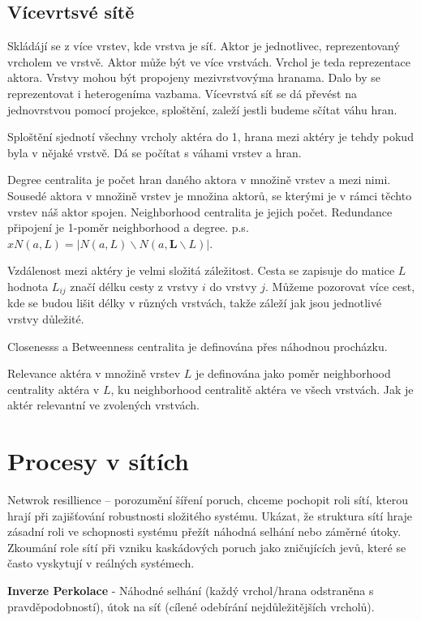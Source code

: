 \documentclass[a4paper,12pt]{article}
\begin{document}
\subsection{Vícevrtsvé sítě}
Skládájí se z více vrstev, kde vrstva je síť. Aktor je jednotlivec, reprezentovaný vrcholem ve vrstvě. Aktor může být ve více vrstvách. Vrchol je teda
reprezentace aktora. Vrstvy mohou být propojeny mezivrstvovýma hranama. Dalo by se reprezentovat i heterogeníma vazbama.
Vícevrstvá síť se dá převést na jednovrstvou pomocí projekce, sploštění, zaleží jestli budeme sčítat váhu hran.

Sploštění sjednotí všechny vrcholy aktéra do 1, hrana mezi aktéry je tehdy pokud byla v nějaké vrstvě. Dá se počítat s váhami vrstev a hran.

Degree centralita je počet hran daného aktora v množině vrstev a mezi nimi. Sousedé aktora v množině vrstev je množina aktorů, se kterými je v rámci těchto vrstev 
náš aktor spojen. Neighborhood centralita je jejich počet. Redundance připojení je 1-poměr neighborhood a degree. p.s.$xN(a,L)=|N(a,L) \smallsetminus N(a,\textbf{L}\smallsetminus L)|$.

Vzdálenost mezi aktéry je velmi složitá záležitost. Cesta se zapisuje do matice $L$ hodnota $L_{ij}$ značí délku cesty z vrstvy $i$ do vrstvy $j$. Můžeme 
pozorovat více cest, kde se budou lišit délky v různých vrstvách, takže záleží jak jsou jednotlivé vrstvy důležité.

Closenesss a Betweenness centralita je definována přes náhodnou procházku.

Relevance aktéra v množině vrstev $L$ je definována jako poměr neighborhood centrality aktéra v $L$, ku neighborhood centralitě aktéra ve všech vrstvách.
Jak je aktér relevantní ve zvolených vrstvách.

\section{Procesy v sítích}
Netwrok resillience – porozumění šíření poruch, chceme pochopit roli sítí, kterou hrají při zajišťování robustnosti složitého systému.
Ukázat, že struktura sítí hraje zásadní roli ve schopnosti systému přežít náhodná selhání nebo záměrné útoky.
Zkoumání role sítí při vzniku kaskádových poruch jako zničujících jevů, které se často vyskytují v reálných systémech.

\textbf{Inverze Perkolace} - Náhodné selhání (každý vrchol/hrana odstraněna s pravděpodobností), útok na síť (cílené odebírání nejdůležitějších vrcholů).
\end{document}
